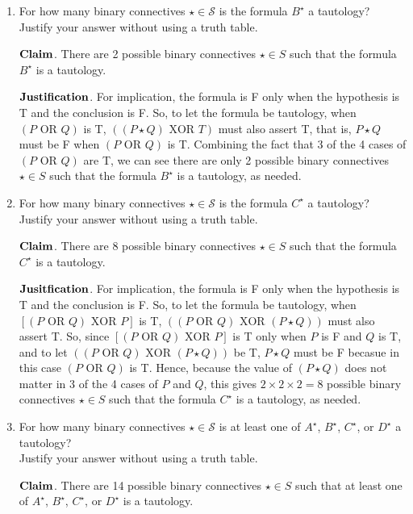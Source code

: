 \documentclass[11pt]{article}
\newcommand{\oor}{\,\,\mathrm{OR}\,\,}
\newcommand{\xor}{\,\,\mathrm{XOR}\,\,}
\begin{document}
\begin{enumerate}
\begin{enumerate}
\item For how many binary connectives $\star \in \mathcal{S}$ is the formula $B^\star$ a tautology?\\
Justify your answer without using a truth table.

$\bold{Claim}$. There are 2 possible binary connectives $\star\in S$ such that the formula $B^\star$ is a tautology.

$\bold{Justification}$. For implication, the formula is F only when the hypothesis is T and the conclusion is F. So, to let the formula be tautology, when $(P\oor Q)$ is T, $((P\star Q)\xor T)$ must also assert T, that is, $P\star Q$ must be F when $(P\oor Q)$ is T. Combining the fact that 3 of the 4 cases of $(P\oor Q)$ are T, we can see there are only 2 possible binary connectives $\star\in S$ such that the formula $B^\star$ is a tautology, as needed.\\

\item For how many binary connectives $\star \in \mathcal{S}$ is the formula $C^\star$ a tautology?\\
Justify your answer without using a truth table.

$\bold{Claim}$. There are 8 possible binary connectives $\star\in S$ such that the formula $C^\star$ is a tautology.

$\bold{Jusitfication}$. For implication, the formula is F only when the hypothesis is T and the conclusion is F. So, to let the formula be tautology, when $[(P\oor Q)\xor P]$ is T, $((P\oor Q)\xor(P\star Q))$ must also assert T. So, since $[(P\oor Q)\xor P]$ is T only when $P$ is F and $Q$ is T, and to let $((P\oor Q)\xor(P\star Q))$ be T, $P\star Q$ must be F becasue in this case $(P\oor Q)$ is T. Hence, because the value of $(P\star Q)$ does not matter in 3 of the 4 cases of $P$ and $Q$, this gives $2\times2\times2=8$ possible binary connectives $\star\in S$ such that the formula $C^\star$ is a tautology, as needed.\\

\item For how many binary connectives $\star \in \mathcal{S}$ is at least one of $A^\star$, $B^\star$, $C^\star$, or $D^\star$ a tautology?\\
Justify your answer without using a truth table.

$\bold{Claim}$. There are 14 possible binary connectives $\star\in S$ such that at least one of $A^\star$, $B^\star$, $C^\star$, or $D^\star$ is a tautology.


\end{enumerate}
\end{enumerate}
\end{document}
